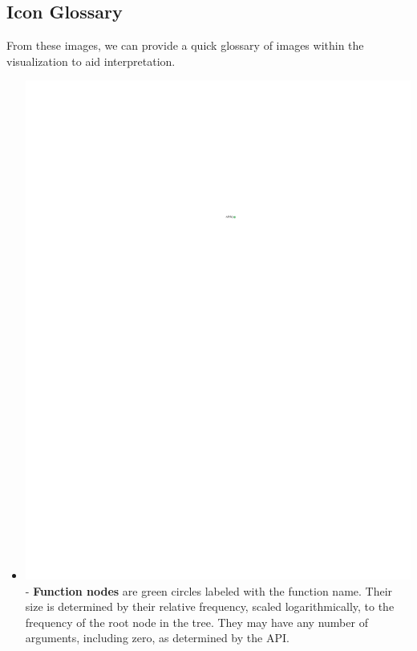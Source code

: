 \documentclass[conference]{IEEEtran}
\begin{document}
	\subsection{Icon Glossary}
	
	From these images, we can provide a quick glossary of images within the
	visualization to aid interpretation. \begin{itemize} \item
		\includegraphics{glossary-green} - \textbf{Function nodes} are green circles
		labeled with the function name. Their size is determined by their relative
		frequency, scaled logarithmically, to the frequency of the root node in the
		tree. They may have any number of arguments, including zero, as determined by
		the API.
		

\end{itemize}
\end{document}
